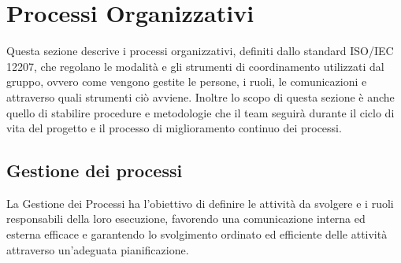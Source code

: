 \documentclass[a4paper, 11pt]{article}
\begin{document}
\section{Processi Organizzativi}
Questa sezione descrive i processi organizzativi, definiti dallo standard ISO/IEC 12207, che regolano le modalità e gli strumenti di coordinamento
utilizzati dal gruppo, ovvero come vengono gestite le persone, i ruoli, le comunicazioni e attraverso quali strumenti ciò avviene. Inoltre lo scopo
di questa sezione è anche quello di stabilire procedure e metodologie che il team seguirà durante il ciclo di vita del progetto e il processo di miglioramento continuo dei processi.

\subsection{Gestione dei processi}
La Gestione dei Processi ha l'obiettivo di definire le attività da svolgere e i ruoli responsabili della loro esecuzione, favorendo una comunicazione interna ed esterna efficace e garantendo lo svolgimento ordinato ed efficiente delle attività attraverso un'adeguata pianificazione.
\end{document}
